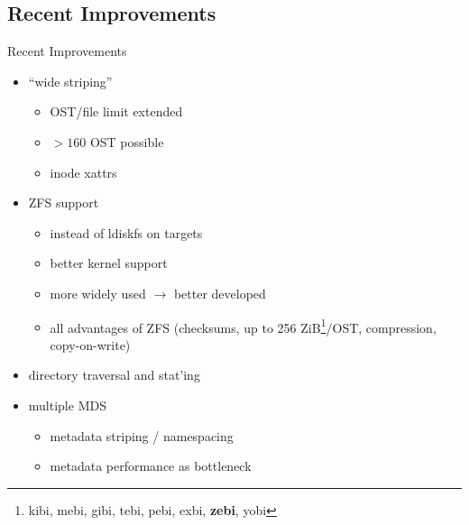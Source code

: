 \subsection{Recent Improvements}
\begin{frame}{Recent Improvements}
    \begin{itemize}
        \item ``wide striping''
            \begin{itemize}
                \item OST/file limit extended
                \item $> 160$ OST possible
                \item inode xattrs
            \end{itemize}
        \item ZFS support
            \begin{itemize}
                \item instead of ldiskfs on targets
                \item better kernel support
                \item more widely used $\rightarrow$ better developed
                \item all advantages of ZFS (checksums, up to 256 ZiB\footnote{kibi, mebi, gibi, tebi, pebi, exbi, \textbf{zebi}, yobi}/OST, compression, copy-on-write)
            \end{itemize}
        \item directory traversal and stat'ing
        \item multiple MDS
            \begin{itemize}
                \item metadata striping / namespacing
                \item metadata performance as bottleneck
            \end{itemize}
    \end{itemize}
\end{frame}

